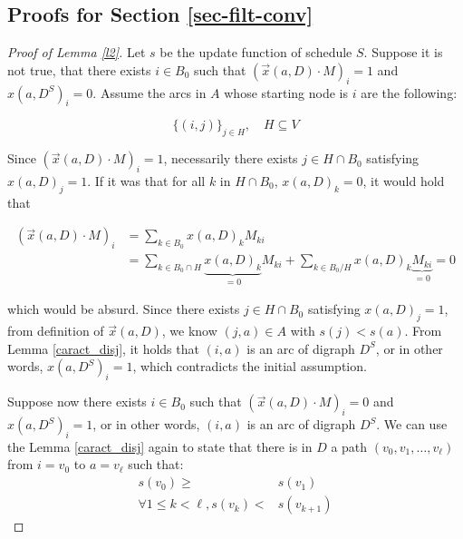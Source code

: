 \documentclass[preprint,12pt]{elsarticle}
\begin{document}
\subsection{Proofs for Section \ref{sec-filt-conv}}


\begin{proof}[{Proof of Lemma \ref{l2}}]
Let $s$ be the update function of schedule $S$. Suppose it is not true, that there exists $i \in B_0$ such that $(\vec{x}(a,D)\cdot M )_i=1$ and $x(a,D^S)_i=0$. Assume the arcs in $A$ whose starting node is $i$ are the following:

$$\{(i,j)\}_{j \in H}, \quad H \subseteq V$$

Since $(\vec{x}(a,D)\cdot M)_i=1$, necessarily there exists $j \in H \cap B_0$ satisfying $x(a,D)_j=1$. If it was that for all $k$ in $H \cap B_0$, $x(a,D)_k=0$, it would hold that 

\begin{align*}
(\vec{x}(a,D)\cdot M)_i &=\sum_{k \in B_0} x(a,D)_k M_{ki}\\  
&= \sum_{k \in B_0 \cap H} \underbrace{x(a,D)_k}_{=0} M_{ki} + \sum_{k \in B_0/H} x(a,D)_k \underbrace{M_{ki}}_{=0} = 0
\end{align*}

which would be absurd. Since there exists $j \in H \cap B_0$ satisfying $x(a,D)_j=1$, from definition of $\vec{x}(a,D)$, we know $(j,a) \in A$ with $s(j)<s(a)$. From Lemma \ref{caract_disj}, it holds that $(i,a)$ is an arc of digraph $D^S$, or in other words,
 $x(a,D^S)_i=1$, which contradicts the initial assumption.\par

Suppose now there exists $i \in B_0$ such that $(\vec{x}(a,D)\cdot M)_i=0$ and $x(a,D^S)_i=1$, or in other words, $(i,a)$ is an arc of digraph $D^S$. %
We can use the Lemma \ref{caract_disj} again to state that there is in $D$ a path $(v_0,v_1,\ldots,v_{\ell})$ from $i=v_0$ to $a=v_{\ell}$ such that: 
\begin{align}
s(v_0)\geq & s(v_1) \label{A1} \\
\forall 1\leq k < \ell, s(v_{k}) <& s(v_{k+1}) \label{A2}
\end{align}  


\end{proof}
\end{document}
